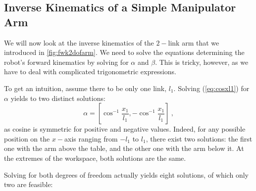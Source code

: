 \subsection{Inverse Kinematics of a Simple Manipulator Arm}\label{sec:kinematics:inverse:arm}

We will now look at the inverse kinematics of the $2-$link arm that we introduced in \cref{fig:fwk2dofarm}. We need to solve the equations determining the robot's forward kinematics by solving for $\alpha$ and $ \beta$.
This is tricky, however, as we have to deal with complicated trigonometric expressions.

To get an intuition, assume there to be only one link, $l_1$.  Solving (\ref{eq:cosxl1}) for $\alpha$ yields to two distinct solutions:
\begin{equation}
\alpha = \left[\cos^{-1}\frac{x_1}{l_1},-\cos^{-1}\frac{x_1}{l_1}\right]\ ,
\end{equation}
as cosine is symmetric for positive and negative values.
Indeed, for any possible position on the $x-$axis ranging from $-l_1$ to $l_1$, there exist two solutions: the first one with the arm above the table, and the other one with the arm below it.
At the extremes of the workspace, both solutions are the same.


Solving for both degrees of freedom actually yields eight solutions, of which only two are feasible:

